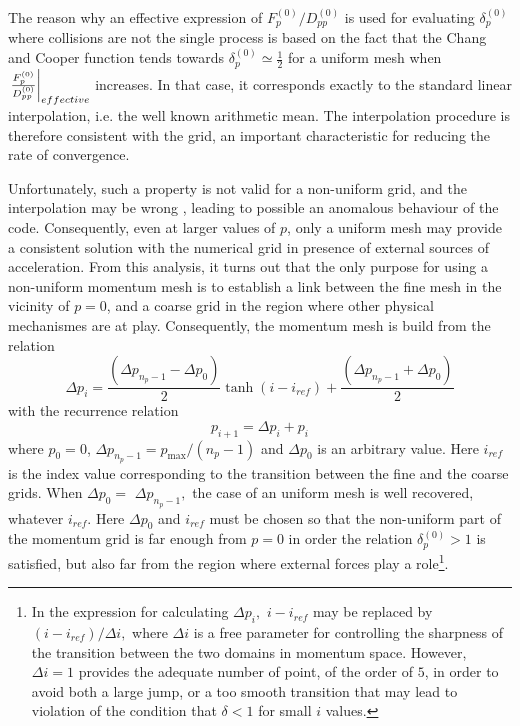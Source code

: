 The reason why an effective expression of $F_{p}^{\left( 0\right)
}/D_{pp}^{\left( 0\right) }$ is used  for evaluating  $\delta _{p}^{\left(
0\right) }$ where collisions are not the single process is based on the fact
that the Chang and Cooper function tends towards $\delta _{p}^{\left(
0\right) }\simeq \frac{1}{2}$ for a uniform mesh when $\left. \frac{%
F_{p}^{\left( 0\right) }}{D_{pp}^{\left( 0\right) }}\right| _{effective}$
increases. In that case, it corresponds exactly to the standard linear
interpolation, i.e. the well known arithmetic mean. The interpolation
procedure is therefore consistent with the grid, an important characteristic
for reducing the rate of convergence.

Unfortunately, such a property is not valid for a non-uniform grid, and the
interpolation may be wrong , leading to possible an anomalous behaviour of
the code. Consequently, even at larger values of $p$, only a uniform mesh
may provide a consistent solution with the numerical grid in presence of
external sources of acceleration. From this analysis, it turns out that the
only purpose for using a non-uniform momentum mesh is to establish a link
between the fine mesh in the vicinity of $p=0$, and a coarse grid in the
region where other physical mechanismes are at play. Consequently, the
momentum mesh is build from the relation
\begin{equation}
\Delta p_{i}=\frac{\left( \Delta p_{n_{p}-1}-\Delta p_{0}\right) }{2}\tanh
\left( i-i_{ref}\right) +\frac{\left( \Delta p_{n_{p}-1}+\Delta p_{0}\right)
}{2}
\end{equation}
with the recurrence relation
\begin{equation}
p_{i+1}=\Delta p_{i}+p_{i}
\end{equation}
where $p_{0}=0$, $\Delta p_{n_{p}-1}=p_{\max }/\left( n_{p}-1\right) $ and $%
\Delta p_{0}$ is an arbitrary value. Here $i_{ref}$ is the index value
corresponding to the transition between the fine and the coarse grids. When $%
\Delta p_{0}=$ $\Delta p_{n_{p}-1},$ the case of an uniform mesh is well
recovered, whatever $i_{ref}$. Here $\Delta p_{0}$ and $i_{ref}$ must be
chosen so that the non-uniform part of the momentum grid is far enough from $%
p=0$ in order the relation $\delta _{p}^{\left( 0\right) }>1$ is satisfied,
but also far from the region where external forces play a role\footnote{%
In the expression for calculating $\Delta p_{i},$  $i-i_{ref}$ may be
replaced by  $\left( i-i_{ref}\right) /\Delta i,$ where $\Delta i$ is a free
parameter for controlling the sharpness of the transition between the two
domains in momentum space. However, $\Delta i=1$ provides the adequate
number of point, of the order of $5$, in order to avoid both a large jump,
or a too smooth transition that may lead to violation of the condition that $%
\delta <1$ for small $i$ values.}.


